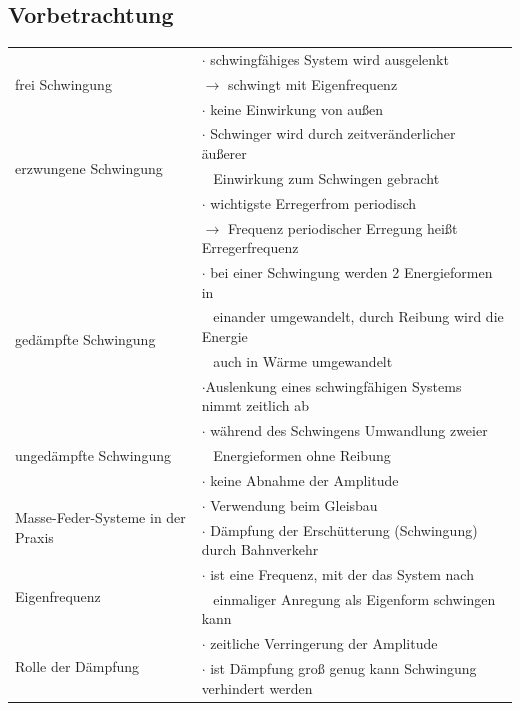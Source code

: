 \documentclass[a4paper,11pt]{scrartcl}
\begin{document}
	\subsection*{Vorbetrachtung}
	\begin{tabularx}{\textwidth}{l|l}
		\multirow{3}{*}{frei Schwingung}& $\cdot$ schwingfähiges System wird ausgelenkt\\
		&$\rightarrow$ schwingt mit Eigenfrequenz\\
		& $\cdot$ keine Einwirkung von außen\\
		\hline
		
		\multirow{3}{*}{erzwungene Schwingung} &$\cdot$ Schwinger wird durch zeitveränderlicher äußerer\\
		&~ Einwirkung zum Schwingen gebracht\\
		&$\cdot$ wichtigste Erregerfrom periodisch\\
		&$\rightarrow$ Frequenz periodischer Erregung heißt Erregerfrequenz\\
		\hline
		
		\multirow{4}{*}{gedämpfte Schwingung}&$\cdot$ bei einer Schwingung werden 2 Energieformen in\\
		&~ einander umgewandelt, durch Reibung wird die Energie\\
		&~ auch in Wärme umgewandelt\\
		&$\cdot$Auslenkung eines schwingfähigen Systems nimmt zeitlich ab\\
		\hline
		
		\multirow{3}{*}{ungedämpfte Schwingung}&$\cdot$ während des Schwingens Umwandlung zweier\\
		&~ Energieformen ohne Reibung\\
		&$\cdot$ keine Abnahme der Amplitude\\
		\hline
		
		\multirow{2}{*}{Masse-Feder-Systeme in der Praxis}&$\cdot$ Verwendung beim Gleisbau \\
		&$\cdot$ Dämpfung der Erschütterung (Schwingung) durch Bahnverkehr\\
		\hline 
		
		\multirow{2}{*}{Eigenfrequenz}&$\cdot$ ist eine Frequenz, mit der das System nach\\
		&~ einmaliger Anregung als Eigenform schwingen kann\\
		\hline
		
		\multirow{2}{*}{Rolle der Dämpfung}&$\cdot$ zeitliche Verringerung der Amplitude \\
		&$\cdot$ ist Dämpfung groß genug kann Schwingung verhindert werden\\
		\hline
		

\end{tabularx}
\end{document}
